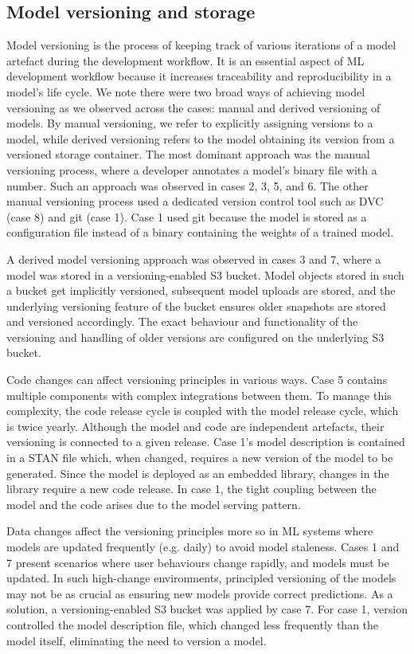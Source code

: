 \subsection{Model versioning and storage}
Model versioning is the process of keeping track of various iterations of a model artefact during the development workflow. It is an essential aspect of ML development workflow because it increases traceability and reproducibility in a model's life cycle. We note there were two broad ways of achieving model versioning as we observed across the cases: manual and derived versioning of models. By manual versioning, we refer to explicitly assigning versions to a model, while derived versioning refers to the model obtaining its version from a versioned storage container. The most dominant approach was the manual versioning process, where a developer annotates a model's binary file with a number. Such an approach was observed in cases 2, 3, 5, and 6. The other manual versioning process used a dedicated version control tool such as DVC (case 8) and git (case 1). Case 1 used git because the model is stored as a configuration file instead of a binary containing the weights of a trained model. 

A derived model versioning approach was observed in cases 3 and 7, where a model was stored in a versioning-enabled S3 bucket. Model objects stored in such a bucket get implicitly versioned, subsequent model uploads are stored, and the underlying versioning feature of the bucket ensures older snapshots are stored and versioned accordingly. The exact behaviour and functionality of the versioning and handling of older versions are configured on the underlying S3 bucket.

Code changes can affect versioning principles in various ways. Case 5 contains multiple components with complex integrations between them. To manage this complexity, the code release cycle is coupled with the model release cycle, which is twice yearly. Although the model and code are independent artefacts, their versioning is connected to a given release. Case 1's model description is contained in a STAN file which, when changed, requires a new version of the model to be generated. Since the model is deployed as an embedded library, changes in the library require a new code release. In case 1, the tight coupling between the model and the code arises due to the model serving pattern.

Data changes affect the versioning principles more so in ML systems where models are updated frequently (e.g. daily) to avoid model staleness. Cases 1 and 7 present scenarios where user behaviours change rapidly, and models must be updated. In such high-change environments, principled versioning of the models may not be as crucial as ensuring new models provide correct predictions. As a solution, a versioning-enabled S3 bucket was applied by case 7. For case 1, \DIFdelbegin {}\DIFdelend \DIFaddbegin {}\DIFaddend version controlled the model description file, which changed less frequently than the model itself, eliminating the need to version a model.


